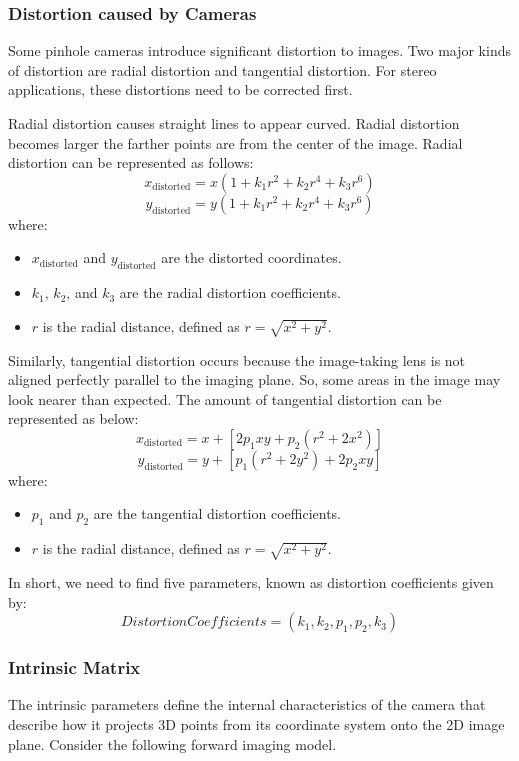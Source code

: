 \subsubsection{Distortion caused by Cameras}
Some pinhole cameras introduce significant distortion to images. Two major kinds of distortion are radial distortion and tangential distortion. For stereo applications, these distortions need to be corrected first.

Radial distortion causes straight lines to appear curved. Radial distortion becomes larger the farther points are from the center of the image. Radial distortion can be represented as follows:
\[
	x_{\text{distorted}} = x \left(1 + k_1 r^2 + k_2 r^4 + k_3 r^6\right)
\]
\[
	y_{\text{distorted}} = y \left(1 + k_1 r^2 + k_2 r^4 + k_3 r^6\right)
\]
where:
\begin{itemize}
	\item \( x_{\text{distorted}} \) and \( y_{\text{distorted}} \) are the distorted coordinates.
	\item \( k_1 \), \( k_2 \), and \( k_3 \) are the radial distortion coefficients.
	\item \( r \) is the radial distance, defined as \( r = \sqrt{x^2 + y^2} \).
\end{itemize}

Similarly, tangential distortion occurs because the image-taking lens is not aligned perfectly parallel to the imaging plane. So, some areas in the image may look nearer than expected. The amount of tangential distortion can be represented as below:
\[
	x_{\text{distorted}} = x + \left[ 2p_1 xy + p_2 (r^2 + 2x^2) \right]
\]
\[
	y_{\text{distorted}} = y + \left[ p_1 (r^2 + 2y^2) + 2p_2 xy \right]
\]
where:
\begin{itemize}
	\item \( p_1 \) and \( p_2 \) are the tangential distortion coefficients.
	\item \( r \) is the radial distance, defined as \( r = \sqrt{x^2 + y^2} \).
\end{itemize}

In short, we need to find five parameters, known as distortion coefficients given by:
\[
	Distortion Coefficients = (k_1, k_2, p_1, p_2, k_3)
\]


\subsubsection{Intrinsic Matrix}
The intrinsic parameters define the internal characteristics of the camera that describe how it projects 3D points from its coordinate system onto the 2D image plane. Consider the following forward imaging model.

